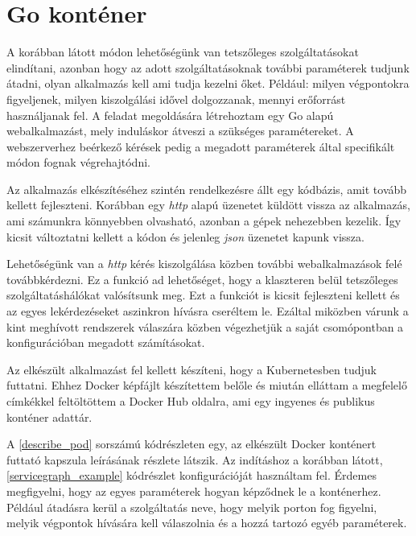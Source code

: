 \section{Go konténer}
A korábban látott módon lehetőségünk van tetszőleges szolgáltatásokat elindítani, azonban hogy az adott szolgáltatásoknak további paraméterek tudjunk átadni, olyan alkalmazás kell ami tudja kezelni őket. Például: milyen végpontokra figyeljenek, milyen kiszolgálási idővel dolgozzanak, mennyi erőforrást használjanak fel.
A feladat megoldására létrehoztam egy Go alapú webalkalmazást, mely induláskor átveszi a szükséges paramétereket. A webszerverhez beérkező kérések pedig a megadott paraméterek által specifikált módon fognak végrehajtódni. 

Az alkalmazás elkészítéséhez szintén rendelkezésre állt egy kódbázis, amit tovább kellett fejleszteni. Korábban egy \textit{http} alapú üzenetet küldött vissza az alkalmazás, ami számunkra könnyebben olvasható, azonban a gépek nehezebben kezelik. Így kicsit változtatni kellett a kódon és jelenleg \textit{json} üzenetet kapunk vissza.

Lehetőségünk van a \textit{http} kérés kiszolgálása közben további webalkalmazások felé továbbkérdezni. Ez a funkció ad lehetőséget, hogy a klaszteren belül tetszőleges szolgáltatáshálókat valósítsunk meg. Ezt a funkciót is kicsit fejleszteni kellett és az egyes lekérdezéseket aszinkron hívásra cseréltem le. Ezáltal miközben várunk a kint meghívott rendszerek válaszára közben végezhetjük a saját csomópontban a konfigurációban megadott számításokat. 

Az elkészült alkalmazást fel kellett készíteni, hogy a Kubernetesben tudjuk futtatni. Ehhez Docker képfájlt készítettem belőle és miután elláttam a megfelelő címkékkel feltöltöttem\citep{dockerContainer} a Docker Hub oldalra, ami egy ingyenes és publikus konténer adattár. \\

\lstset{caption=Kénténer futtatása és válasza, label=describe_pod}


A \ref{describe_pod} sorszámú kódrészleten egy, az elkészült Docker konténert futtató kapszula leírásának részlete látszik. Az indításhoz a korábban látott, \ref{servicegraph_example} kódrészlet konfigurációját használtam fel. Érdemes megfigyelni, hogy az egyes  paraméterek hogyan képződnek le a konténerhez. Például átadásra kerül a szolgáltatás neve, hogy melyik porton fog figyelni, melyik végpontok hívására kell válaszolnia és a hozzá tartozó egyéb paraméterek.

